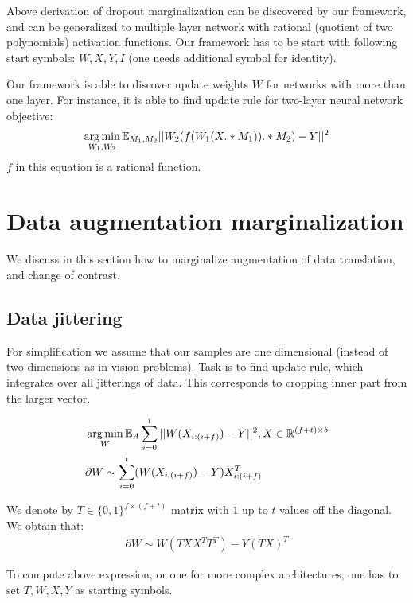 Above derivation of dropout marginalization can be discovered by our framework, and can be generalized
to multiple layer network with rational (quotient of two polynomials) activation functions. Our framework
has to be start with following start symbols: $W, X, Y, I$ (one needs additional symbol for identity).


Our framework is able to discover update weights $W$ for networks with more than one layer. 
For instance, it is able to find update rule for two-layer neural network objective:
\begin{equation*}
  \operatorname*{arg\,min}_{W_1, W_2} \mathbb{E}_{M_1, M_2} ||W_2(f(W_1(X .* M_1)) .* M_2) - Y||^2
\end{equation*}
$f$ in this equation is a rational function. 


\section{Data augmentation marginalization}\label{sec:augm}
We discuss in this section how to marginalize augmentation of data translation, and change of contrast. 

\subsection{Data jittering}
For simplification we assume that our samples are one dimensional (instead of two dimensions as in
vision problems). Task is to find update rule, which integrates over all jitterings of data. This
corresponds to cropping inner part from the larger vector.

\begin{align*}
& \operatorname*{arg\,min}_{W} \mathbb{E}_A \sum_{i = 0}^t||W(X_{i : (i + f)}) - Y||^2, X \in \mathbb{R}^{(f + t) \times b}\\
& \partial W \sim \sum_{i = 0}^t(W(X_{i : (i + f)}) - Y) X_{i : (i + f)}^T
\end{align*}

We denote by $T \in \{0, 1\}^{f \times (f + t)}$ matrix with $1$ up to $t$ values off the diagonal.
We obtain that:
\begin{align*}
\partial W \sim W(TXX^TT^T) - Y(TX)^T 
\end{align*}

To compute above expression, or one for more complex architectures, one
has to set $T, W, X, Y$ as starting symbols.

